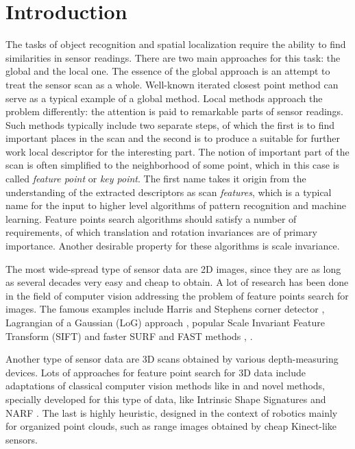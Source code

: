 \section{Introduction}

The tasks of object recognition and spatial localization require the ability to find similarities in sensor readings. There are two main approaches for this task: the global and the local one. The essence of the global approach is an attempt to treat the sensor scan as a whole. Well-known iterated closest point method \cite{besl1992method} can serve as a typical example of a global method. Local methods approach the problem differently: the attention is paid to remarkable parts of sensor readings. Such methods typically include two separate steps, of which the first is to find important places in the scan and the second is to produce a suitable for further work local descriptor  for the interesting part. The notion of important part of the scan is often simplified to the neighborhood of some point, which in this case is called \textit{feature point} or \textit{key point}. The first name takes it origin from   
the understanding of the extracted descriptors as scan \textit{features}, which is a typical name for the input to higher level algorithms of pattern recognition and machine learning. Feature points search algorithms should satisfy a number of requirements, of which translation and rotation invariances are of primary importance. Another desirable property for these algorithms is scale invariance.

The most wide-spread type of sensor data are 2D images, since they are as long as several decades very easy and cheap to obtain. A lot of research has been done in the field of computer vision addressing the problem of feature points search for images. The famous examples include Harris and Stephens corner detector \cite{harris1988combined}, Lagrangian of a Gaussian (LoG) approach \cite{lindeberg1998feature}, popular Scale Invariant Feature Transform (SIFT) \cite{lowe2004distinctive} and faster SURF and FAST methods \cite{bay2006surf}, \cite{rosten2010faster}.

Another type of sensor data are 3D scans obtained by various depth-measuring devices. Lots of approaches for feature point search for 3D data include adaptations of classical computer vision methods like in \cite{sipiran2011harris} and novel methods, specially developed for this type of data, like Intrinsic Shape Signatures \cite{zhong2009intrinsic} and NARF \cite{steder2011point}. The last is highly heuristic, designed in the context of robotics mainly for organized point clouds, such as range images obtained by cheap Kinect-like sensors.

